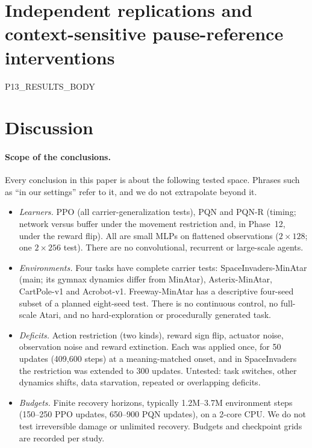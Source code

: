 \documentclass[10pt]{article} %
\begin{document}
\section{Independent replications and context-sensitive pause-reference interventions}\label{sec:p13}
P13_RESULTS_BODY

\section{Discussion}

\paragraph{Scope of the conclusions.} Every conclusion in this paper is about the following tested space. Phrases such as ``in our settings'' refer to it, and we do not extrapolate beyond it.
\begin{itemize}
\item \emph{Learners.} PPO (all carrier-generalization tests), PQN and PQN-R (timing; network versus buffer under the movement restriction and, in Phase~12, under the reward flip). All are small MLPs on flattened observations ($2\times128$; one $2\times256$ test). There are no convolutional, recurrent or large-scale agents.
\item \emph{Environments.} Four tasks have complete carrier tests: SpaceInvaders-MinAtar (main; its gymnax dynamics differ from MinAtar), Asterix-MinAtar, CartPole-v1 and Acrobot-v1. Freeway-MinAtar has a descriptive four-seed subset of a planned eight-seed test. There is no continuous control, no full-scale Atari, and no hard-exploration or procedurally generated task.
\item \emph{Deficits.} Action restriction (two kinds), reward sign flip, actuator noise, observation noise and reward extinction. Each was applied once, for 50 updates (409{,}600 steps) at a meaning-matched onset, and in SpaceInvaders the restriction was extended to 300 updates. Untested: task switches, other dynamics shifts, data starvation, repeated or overlapping deficits.
\item \emph{Budgets.} Finite recovery horizons, typically 1.2M--3.7M environment steps (150--250 PPO updates, 650--900 PQN updates), on a 2-core CPU. We do not test irreversible damage or unlimited recovery. Budgets and checkpoint grids are recorded per study.
\end{itemize}
\end{document}
